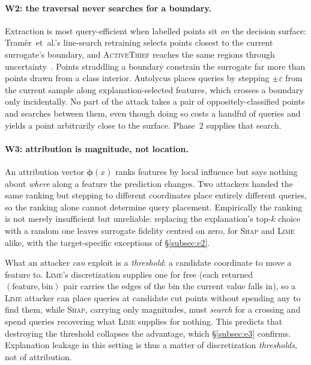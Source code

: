 \documentclass[sigconf,anonymous,review]{acmart}
\begin{document}
\paragraph{W2: the traversal never searches for a boundary.}
Extraction is most query-efficient when labelled points sit \emph{on} the decision
surface: Tram\`er~et~al.'s line-search retraining selects points closest to the current surrogate's
boundary, and \textsc{ActiveThief} reaches the same regions through
uncertainty~\cite{tramer2016stealing,pal2020activethief}. Points straddling a boundary constrain the surrogate far more than
points drawn from a class interior. Autolycus places queries by stepping $\pm\varepsilon$ from the
current sample along explanation-selected features, which crosses a boundary only incidentally. No
part of the attack takes a pair of oppositely-classified points and searches between them, even though
doing so costs a handful of queries and yields a point arbitrarily close to the surface. Phase~2
supplies that search.

\paragraph{W3: attribution is magnitude, not location.}
An attribution vector $\boldsymbol{\phi}(x)$ ranks features by local influence but says nothing about
\emph{where} along a feature the prediction changes. Two attackers handed the same ranking but
stepping to different coordinates place entirely different queries, so the ranking alone cannot
determine query placement. Empirically the ranking is not merely insufficient but unreliable:
replacing the explanation's top-$k$ choice with a random one leaves surrogate fidelity centred on
zero, for \textsc{Shap} and \textsc{Lime} alike, with the target-specific exceptions of
\S\ref{subsec:e2}.

What an attacker \emph{can} exploit is a \emph{threshold}: a candidate coordinate to move a feature
to. \textsc{Lime}'s discretization supplies one for free (each returned $(\text{feature}, \text{bin})$ pair carries the edges of the bin the current value falls in), so a \textsc{Lime} attacker
can place queries at candidate cut points without spending any to find them, while \textsc{Shap},
carrying only magnitudes, must \emph{search} for a crossing and spend queries recovering what
\textsc{Lime} supplies for nothing. This
predicts that destroying the threshold collapses the advantage, which \S\ref{subsec:e3} confirms.
Explanation leakage in this setting is thus a matter of discretization \emph{thresholds}, not of attribution.
\end{document}
